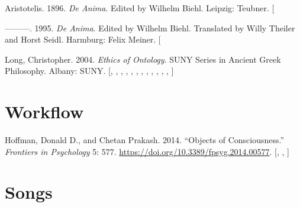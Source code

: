 \documentclass[
  12pt,
  a4paper,
  oneside,
  numbers=noenddot,
  titlepage,
  toclink=all,
  toc=bibliography]{scrbook}
\newlength{\cslhangindent}
\newlength{\cslentryspacingunit} %
\newenvironment{CSLReferences}[2] %
 {%
  \setlength{\parindent}{0pt}
  \ifodd #1
  \let\oldpar\par
  \def\par{\hangindent=\cslhangindent\oldpar}
  \fi
  \setlength{\parskip}{#2\cslentryspacingunit}
 }%
 {}
\theoremstyle{definition}
\theoremstyle{definition}
\theoremstyle{definition}
\theoremstyle{plain}
\theoremstyle{plain}
\theoremstyle{plain}
\theoremstyle{plain}
\theoremstyle{plain}
\theoremstyle{remark}
\begin{document}
\hypertarget{refs_scriv117}{}
\begin{CSLReferences}{1}{0}
\leavevmode{}%
Aristotelis. 1896. \emph{De Anima}. Edited by Wilhelm Biehl. Leipzig:
Teubner. {[}\Acrobatmenu{GoBack}{$\hookleftarrow$}{]}

\leavevmode{}%
---------. 1995. \emph{De Anima}. Edited by Wilhelm Biehl. Translated by
Willy Theiler and Horst Seidl. Harmburg: Felix Meiner.
{[}\Acrobatmenu{GoBack}{$\hookleftarrow$}{]}

\leavevmode{}%
Long, Christopher. 2004. \emph{Ethics of Ontology}. SUNY Series in
Ancient Greek Philosophy. Albany: SUNY.
{[},
\protect\hyperlink{cite_97}{\pageref{cite_97}},
\protect\hyperlink{cite_98}{\pageref{cite_98}},
\protect\hyperlink{cite_99}{\pageref{cite_99}},
\protect\hyperlink{cite_100}{\pageref{cite_100}},
\protect\hyperlink{cite_101}{\pageref{cite_101}},
\protect\hyperlink{cite_102}{\pageref{cite_102}},
\protect\hyperlink{cite_103}{\pageref{cite_103}},
\protect\hyperlink{cite_104}{\pageref{cite_104}},
\protect\hyperlink{cite_105}{\pageref{cite_105}},
\protect\hyperlink{cite_106}{\pageref{cite_106}},
\protect\hyperlink{cite_107}{\pageref{cite_107}},
\protect\hyperlink{cite_108}{\pageref{cite_108}}{]}

\end{CSLReferences}

\hypertarget{sec-scriv163}{%
\section{Workflow}\label{sec-scriv163}}

\hypertarget{refs_scriv163}{}
\begin{CSLReferences}{1}{0}
\leavevmode{}%
Hoffman, Donald D., and Chetan Prakash. 2014. {``Objects of
Consciousness.''} \emph{Frontiers in Psychology} 5: 577.
\url{https://doi.org/10.3389/fpsyg.2014.00577}.
{[},
\protect\hyperlink{cite_107}{\pageref{cite_107}},
\protect\hyperlink{cite_108}{\pageref{cite_108}}{]}

\end{CSLReferences}

\hypertarget{sec-scriv164}{%
\section{Songs}\label{sec-scriv164}}
\end{document}
